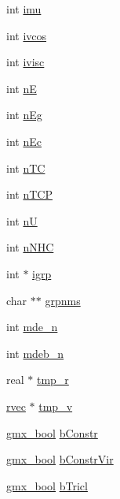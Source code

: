 \begin{DoxyCompactItemize}
int \hyperlink{structt__mdebin_ae15ba2cc869b19d6c0d08e607cc1133b}{imu}
\item 
int \hyperlink{structt__mdebin_aec76ab5eb1e3716843434eb81b111eef}{ivcos}
\item 
int \hyperlink{structt__mdebin_ad75f0e0bbf663d03a995be7fd6f74ac9}{ivisc}
\item 
int \hyperlink{structt__mdebin_a614a522124a8d82826d318b29634a736}{n\-E}
\item 
int \hyperlink{structt__mdebin_a28e7dee7c3c5db5c57fee93d727ef7e4}{n\-Eg}
\item 
int \hyperlink{structt__mdebin_a1f43997ba0ff545fbf34294e4ab8407b}{n\-Ec}
\item 
int \hyperlink{structt__mdebin_aa6c84965752857abee9db32972dac95c}{n\-T\-C}
\item 
int \hyperlink{structt__mdebin_a77420d9bc59426d3178c676511d76ac5}{n\-T\-C\-P}
\item 
int \hyperlink{structt__mdebin_a66d06ca2e91b91fc7303c3f83d5e0e1e}{n\-U}
\item 
int \hyperlink{structt__mdebin_a31c2770c733f8fecab35b7acfd81ddb7}{n\-N\-H\-C}
\item 
int $\ast$ \hyperlink{structt__mdebin_a90625895d3496d28c0c80d86a0a63012}{igrp}
\item 
char $\ast$$\ast$ \hyperlink{structt__mdebin_a7d198c4f512a3b0ff9f1d5bb4282546d}{grpnms}
\item 
int \hyperlink{structt__mdebin_a0287fff12af48f8b65e27679fcc48c67}{mde\-\_\-n}
\item 
int \hyperlink{structt__mdebin_a575814d5a24bfded7ec0e84cde14b55d}{mdeb\-\_\-n}
\item 
real $\ast$ \hyperlink{structt__mdebin_a694d12d771f532f4ab80fad1aeb445bd}{tmp\-\_\-r}
\item 
\hyperlink{share_2template_2gromacs_2types_2simple_8h_aa02a552a4abd2f180c282a083dc3a999}{rvec} $\ast$ \hyperlink{structt__mdebin_ae78018b9e72f3956c6d84e3b6d069229}{tmp\-\_\-v}
\item 
\hyperlink{include_2types_2simple_8h_a8fddad319f226e856400d190198d5151}{gmx\-\_\-bool} \hyperlink{structt__mdebin_ac40443aeac689606c0bf01caad4c0fc5}{b\-Constr}
\item 
\hyperlink{include_2types_2simple_8h_a8fddad319f226e856400d190198d5151}{gmx\-\_\-bool} \hyperlink{structt__mdebin_af5235793de565af8c3799fc7244d3542}{b\-Constr\-Vir}
\item 
\hyperlink{include_2types_2simple_8h_a8fddad319f226e856400d190198d5151}{gmx\-\_\-bool} \hyperlink{structt__mdebin_a2a26ec84da19ed231157425b2cfdc858}{b\-Tricl}
$$
\end{DoxyCompactItemize}
